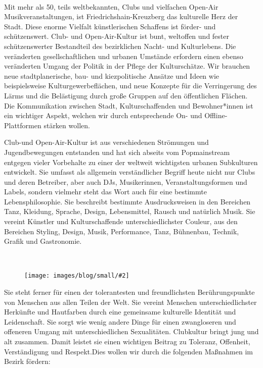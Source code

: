 \documentclass[a4paper,10pt]{article}
\newcommand{\mysection}[1]{{\vspace{1cm}\noindent\color{gray}{\ttfamily\LARGE\raggedright #1}\\\medskip}}
\newcommand{\abschnitt}[2]{%
\mysection{\raggedright #1}%
\begin{figure}[t]%
\vspace*{-2.7cm}%
\hspace*{-2.1cm}%
\texttt{[image: images/blog/small/\#2]} %
\end{figure}%
}
\begin{document}
\mysection{Kultur}

Mit mehr als 50, teils weltbekannten, Clubs und vielfachen Open-Air
Musikveranstaltungen, ist Friedrichshain-Kreuzberg das kulturelle Herz
der Stadt. Diese enorme Vielfalt künstlerischen Schaffens ist förder-
und schützenswert. Club- und Open-Air-Kultur ist bunt, weltoffen und
fester schützenswerter Bestandteil des bezirklichen Nacht- und
Kulturlebens. Die veränderten gesellschaftlichen und urbanen Umstände
erfordern einen ebenso veränderten Umgang der Politik in der Pflege der
Kulturschätze. Wir brauchen neue stadtplanerische, bau- und
kiezpolitische Ansätze und Ideen wie beispielsweise
Kulturgewerbeflächen, und neue Konzepte für die Verringerung des Lärms
und die Belästigung durch große Gruppen auf den öffentlichen Flächen.
Die Kommunikation zwischen Stadt, Kulturschaffenden und Bewohner*innen
ist ein wichtiger Aspekt, welchen wir durch entsprechende On- und
Offline-Plattformen stärken wollen.

Club-und Open-Air-Kultur ist aus verschiedenen Strömungen und
Jugendbewegungen entstanden und hat sich abseits vom Popmainstream
entgegen vieler Vorbehalte zu einer der weltweit wichtigsten urbanen
Subkulturen entwickelt. Sie umfasst als allgemein verständlicher Begriff
heute nicht nur Clubs und deren Betreiber, aber auch DJs, Musikerinnen,
Veranstaltungsformen und Labels, sondern vielmehr steht das Wort auch
für eine bestimmte Lebensphilosophie. Sie beschreibt bestimmte
Ausdrucksweisen in den Bereichen Tanz, Kleidung, Sprache, Design,
Lebensmittel, Rausch und natürlich Musik. Sie vereint Künstler und
Kulturschaffende unterschiedlichster Couleur, aus den Bereichen Styling,
Design, Musik, Performance, Tanz, Bühnenbau, Technik, Grafik und
Gastronomie.

\clearpage
\abschnitt{}{Deephouse.png}

Sie steht ferner für einen der tolerantesten und freundlichsten
Berührungspunkte von Menschen aus allen Teilen der Welt. Sie vereint
Menschen unterschiedlichster Herkünfte und Hautfarben durch eine
gemeinsame kulturelle Identität und Leidenschaft. Sie sorgt wie wenig
andere Dinge für einen zwangloseren und offeneren Umgang mit
unterschiedlichen Sexualitäten. Clubkultur bringt jung und alt zusammen.
Damit leistet sie einen wichtigen Beitrag zu Toleranz, Offenheit,
Verständigung und Respekt.Dies wollen wir durch die folgenden Maßnahmen
im Bezirk fördern:
\end{document}
